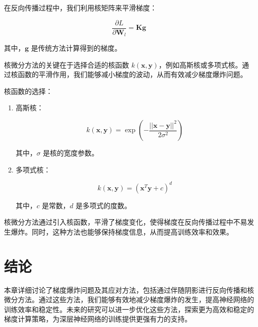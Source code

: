 在反向传播过程中，我们利用核矩阵来平滑梯度：

\[ \frac{\partial L}{\partial \mathbf{W}_l} = \mathbf{K} \mathbf{g} \]

其中，\(\mathbf{g}\) 是传统方法计算得到的梯度。

核微分方法的关键在于选择合适的核函数 \(k(\mathbf{x}, \mathbf{y})\)，例如高斯核或多项式核。通过核函数的平滑作用，我们能够减小梯度的波动，从而有效减少梯度爆炸问题。

核函数的选择：

\begin{enumerate}

\item 高斯核：

\[ k(\mathbf{x}, \mathbf{y}) = \exp\left(-\frac{||\mathbf{x} - \mathbf{y}||^2}{2\sigma^2}\right) \]

其中，\(\sigma\) 是核的宽度参数。

\item 多项式核：

\[ k(\mathbf{x}, \mathbf{y}) = (\mathbf{x}^T \mathbf{y} + c)^d \]

其中，\(c\) 是常数，\(d\) 是多项式的度数。

\end{enumerate}

核微分方法通过引入核函数，平滑了梯度变化，使得梯度在反向传播过程中不易发生爆炸。同时，这种方法也能够保持梯度信息，从而提高训练效率和效果。

\section{结论}

本章详细讨论了梯度爆炸问题及其应对方法，包括通过伴随阴影进行反向传播和核微分方法。通过这些方法，我们能够有效地减少梯度爆炸的发生，提高神经网络的训练效率和稳定性。未来的研究可以进一步优化这些方法，探索更为高效和稳定的梯度计算策略，为深层神经网络的训练提供更强有力的支持。

